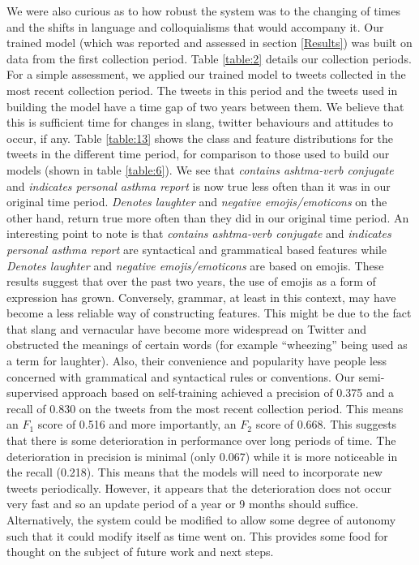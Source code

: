 \documentclass[10pt,letterpaper]{article}
\begin{document}
We were also curious as to how robust the system was to the changing of times and the shifts in language  and colloquialisms that would accompany it. Our trained model (which was reported and assessed in section \ref{Results}) was built on data from the first collection period. Table \ref{table:2} details our collection periods. For a simple assessment, we applied our trained model to tweets collected in the most recent collection period. The tweets in this period and the tweets used in building the model have a time gap of two years between them. We believe that this is sufficient time for changes in slang, twitter behaviours and attitudes to occur, if any. Table \ref{table:13} shows the class and feature distributions for the tweets in the different time period, for comparison to those used to build our models (shown in table \ref{table:6}). We see that \textit{contains ashtma-verb conjugate} and \textit{indicates personal asthma report} is now true less often than it was in our original time period. \textit{Denotes laughter} and \textit{negative emojis/emoticons} on the other hand, return true more often than they did in our original time period. An interesting point to note is that \textit{contains ashtma-verb conjugate} and \textit{indicates personal asthma report} are syntactical and grammatical based features while \textit{Denotes laughter} and \textit{negative emojis/emoticons} are based on emojis. These results suggest that over the past two years, the use of emojis as a form of expression has grown. Conversely, grammar, at least in this context, may have become a less reliable way of constructing features. This might be due to the fact that slang and vernacular have become more widespread on Twitter and obstructed the meanings of certain words (for example ``wheezing'' being used as a term for laughter). Also, their convenience and popularity have people less concerned with grammatical and syntactical rules or conventions. Our semi-supervised approach based on self-training achieved a precision of 0.375 and a recall of 0.830 on the tweets from the most recent collection period. This means an $F_1$ score of 0.516 and more importantly, an $F_2$ score of 0.668. This suggests that there is some deterioration in performance over long periods of time. The deterioration in precision is minimal (only 0.067) while it is more noticeable in the recall (0.218). This means that the models will need to incorporate new tweets periodically. However, it appears that the deterioration does not occur very fast and so an update period of a year or 9 months should suffice. Alternatively, the system could be modified to allow some degree of autonomy such that it could modify itself as time went on. This provides some food for thought on the subject of future work and next steps. \\ 
%
\end{document}
